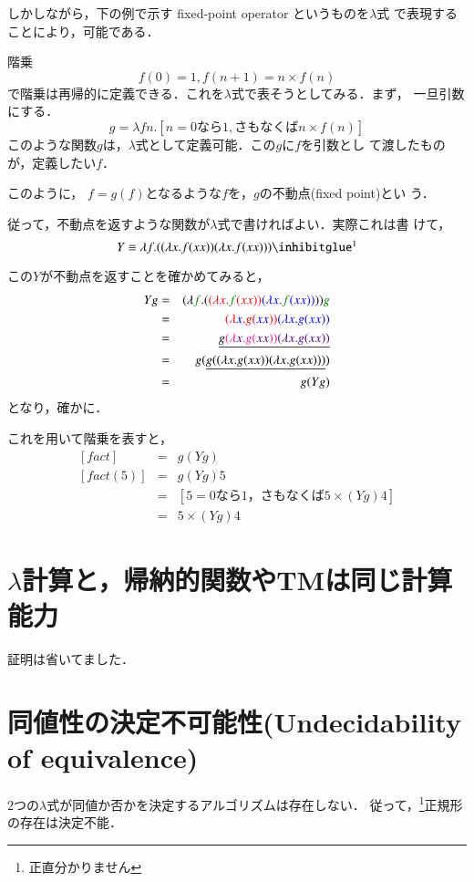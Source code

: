 しかしながら，下の例で示す fixed-point operator というものを$\lambda$式
で表現することにより，可能である．

\begin{myexample}{階乗}
 \[
  f(0) = 1 , f(n+1)  = n \times f(n)
 \]
 で階乗は再帰的に定義できる．これを$\lambda$式で表そうとしてみる．まず，
 一旦引数にする．
 \[
  g = \lambda fn . \left[n = 0 なら1, さもなくば n \times f(n)\right]
 \]
 このような関数$g$は，$\lambda$式として定義可能．この$g$に$f$を引数とし
 て渡したものが，定義したい$f$．

 このように， $f = g(f)$となるような$f$を，$g$の不動点(fixed point)とい
 う．

 従って，不動点を返すような関数が$\lambda$式で書ければよい．実際これは書
 けて，
 \[
  Y \equiv \lambda f . ((\lambda x . f(xx)) (\lambda x . f(xx))) \footnotemark
 \]
 
 この$Y$が不動点を返すことを確かめてみると，
 \begin{eqnarray*}
  Yg &=& (\lambda \textcolor{Green}f . ( \textcolor{red}{(\lambda x . \textcolor{Green}{f}(xx))}
   \textcolor{blue}{(\lambda x . \textcolor{Green}{f}(xx))} )) \textcolor{Green}{g} \\
  &=& \textcolor{red}{(\lambda \textcolor{blue}{x} . g(\textcolor{blue}{xx}))} \textcolor{blue}{(\lambda x . g(xx))} \\
  &=& \underline{g\textcolor{DeepPink}{(\lambda \textcolor{Indigo}{x} . g(\textcolor{Indigo}{xx}))} \textcolor{Indigo}{(\lambda x . g(xx))}} \\
  &=& g( \underline{g((\lambda x . g(xx))(\lambda x . g(xx)))}) \\ 
  &=& g(Yg)
 \end{eqnarray*}
 となり，確かに．

 これを用いて階乗を表すと，
 \begin{eqnarray*}
  \left[fact\right] &=& g(Yg) \\
  \left[fact(5)\right] &=& g(Yg) 5 \\
  &=& \left[5 = 0 なら1，さもなくば 5 \times (Yg) 4\right] \\
  &=& 5 \times (Yg)4
 \end{eqnarray*}
\end{myexample}

\section{$\lambda$計算と，帰納的関数やTMは同じ計算能力}
証明は省いてました．

\section{同値性の決定不可能性(Undecidability of equivalence)}
2つの$\lambda$式が同値か否かを決定するアルゴリズムは存在しない．
従って，\footnote{正直分かりません}正規形の存在は決定不能．
